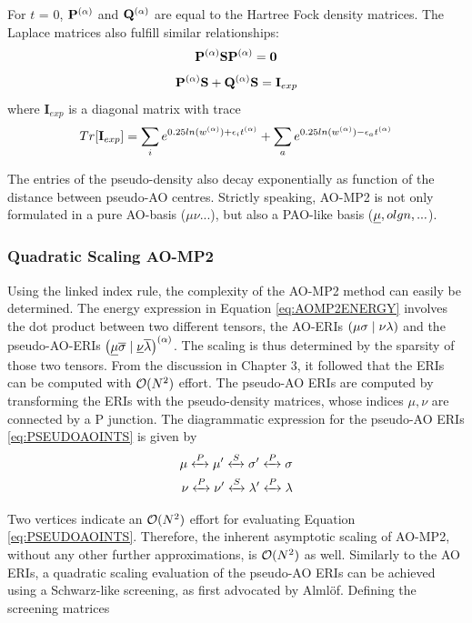 \noindent For $t$ = 0, $\mathbf{P}^{(\alpha)}$ and $\mathbf{Q}^{(\alpha)}$ are equal to the Hartree Fock density matrices. The Laplace matrices also fulfill similar relationships:
\begin{equation}
\mathbf{P}^{(\alpha)} \mathbf{S} \mathbf{P}^{(\alpha)} = \mathbf{0}
\label{eq:PSP0}
\end{equation}
\begin{equation}
\mathbf{P}^{(\alpha)} \mathbf{S} + \mathbf{Q}^{(\alpha)} \mathbf{S} = \mathbf{I}_{exp}
\end{equation}
\noindent where $\mathbf{I}_{exp}$ is a diagonal matrix with trace
\begin{equation}
Tr[\mathbf{I}_{exp}] = \sum_i e^{0.25 ln(w^{(\alpha)}) + \epsilon_i t^{(\alpha)}} + \sum_a e^{0.25 ln(w^{(\alpha)}) - \epsilon_a t^{(\alpha)}}
\end{equation}

The entries of the pseudo-density also decay exponentially as function of the distance between pseudo-AO centres. Strictly speaking, AO-MP2 is not only formulated in a pure AO-basis ($\mu\nu...$), but also a PAO-like basis ($\underline{\mu},olgn,...$). 

\subsubsection{Quadratic Scaling AO-MP2}

Using the linked index rule, the complexity of the AO-MP2 method can easily be determined. The energy expression in Equation \ref{eq:AOMP2ENERGY} involves the dot product between two different tensors, the AO-ERIs $\left( \mu\sigma \mid \nu\lambda \right)$ and the pseudo-AO-ERIs $\left( \underline{\mu}\overline{\sigma} \mid \underline{\nu}\overline{\lambda} \right)^{(\alpha)}$. The scaling is thus determined by the sparsity of those two tensors. From the discussion in Chapter 3, it followed that the ERIs can be computed with $\mathcal{O}(N^{2})$ effort. The pseudo-AO ERIs are computed by transforming the ERIs with the pseudo-density matrices, whose indices $\mu,\nu$ are connected by a P junction. The diagrammatic expression for the pseudo-AO ERIs \ref{eq:PSEUDOAOINTS} is given by
\begin{equation}
\begin{split}
\mu \xleftrightarrow{P} \mu' \xleftrightarrow{S} \sigma' \xleftrightarrow{P} \sigma \\
\nu \xleftrightarrow{P} \nu' \xleftrightarrow{S} \lambda' \xleftrightarrow{P} \lambda
\end{split}
\end{equation}

\noindent Two vertices indicate an $\mathcal{O}(N^{2})$ effort for evaluating Equation \ref{eq:PSEUDOAOINTS}. Therefore, the inherent asymptotic scaling of AO-MP2, without any other further approximations, is $\mathcal{O}(N^{2})$ as well. Similarly to the AO ERIs, a quadratic scaling evaluation of the pseudo-AO ERIs can be achieved using a Schwarz-like screening, as first advocated by Almlöf. Defining the screening matrices

